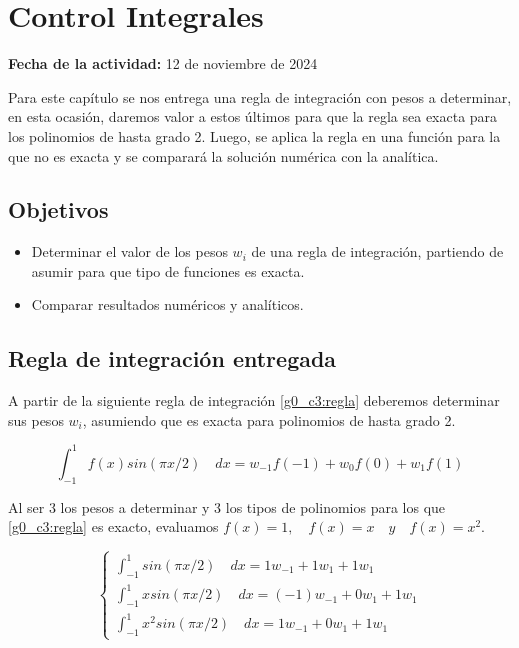 \documentclass[../portafolio.tex]{subfiles}
\begin{document}
\chapter{Control Integrales}
\label{g0_c3}
\hfill \textbf{Fecha de la actividad:} 12 de noviembre de 2024

\medskip

Para este capítulo se nos entrega una regla de integración con pesos a determinar, en esta ocasión, daremos valor a estos últimos para que la regla sea exacta para los polinomios de hasta grado 2. Luego, se aplica la regla en una función para la que no es exacta y se comparará la solución numérica con la analítica.

\section*{Objetivos}
\begin{itemize}
\item Determinar el valor de los pesos $w_i$ de una regla de integración, partiendo de asumir para que tipo de funciones es exacta.
\item Comparar resultados numéricos y analíticos.
\end{itemize}



\section{Regla de integración entregada}

A partir de la siguiente regla de integración \eqref{g0_c3:regla} deberemos determinar sus pesos $w_i$, asumiendo que es exacta para polinomios de hasta grado 2.

\begin{equation}\label{g0_c3:regla}
\int_{-1}^{1} f(x) sin(\pi x/2) \quad dx =w_{-1} f(-1) + w_0 f(0) + w_1 f(1)
\end{equation}

Al ser 3 los pesos a determinar y 3 los tipos de polinomios para los que \eqref{g0_c3:regla} es exacto, evaluamos $f(x)=1,\quad f(x)=x \quad y \quad f(x)=x^2$.

\[
\begin{cases}
\int_{-1}^{1}sin(\pi x/2)\quad dx =1w_{-1}+1w_1  + 1w_1 \\
\int_{-1}^{1}x sin(\pi x/2)\quad dx =(-1)w_{-1}+0w_1  + 1w_1 \\
\int_{-1}^{1}x^2 sin(\pi x/2)\quad dx =1w_{-1}+0w_1  + 1w_1 
\end{cases}
\]
\end{document}
